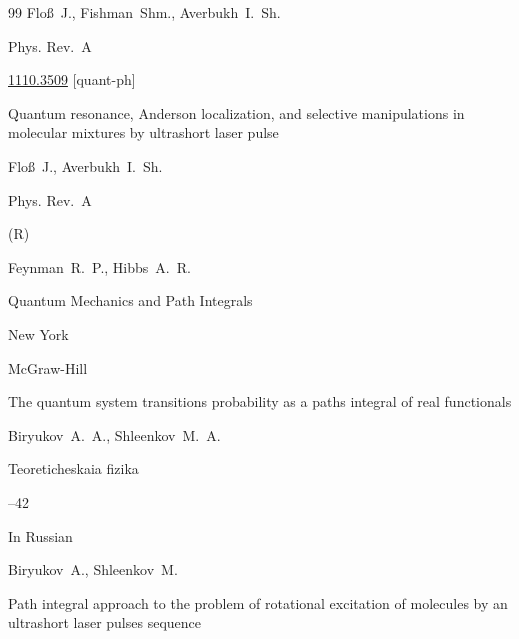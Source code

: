 \begin{thebibliography}{99}
\by  Flo\ss~J.,  Fishman~Shm., Averbukh~I.~Sh.

\jour Phys. Rev.~A









\arxiv \href{http://arxiv.org/abs/1110.3509}{1110.3509} [quant-ph]

\paper Quantum resonance, Anderson localization, and selective manipulations in molecular mixtures by ultrashort laser pulse 

\by Flo\ss~J., Averbukh~I.~Sh.  

\jour Phys. Rev.~A




(R)





\by Feynman~R.~P., Hibbs~A.~R. 


\book Quantum Mechanics and Path Integrals

\publaddr New York

\publ McGraw-Hill




\paper The quantum system transitions probability as a paths integral of real functionals

 \by Biryukov~A.~A., Shleenkov~M.~A.

\jour Teoreticheskaia fizika



--42

\lang In Russian




\by Biryukov~A., Shleenkov~M.

\preprint  Path integral approach to the problem of rotational excitation of molecules by an ultrashort laser pulses sequence 


\end{thebibliography}
